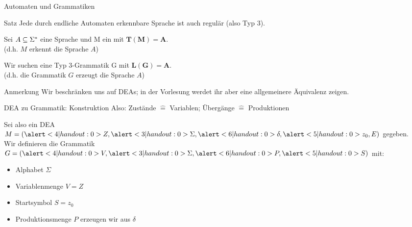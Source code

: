 \begin{frame}{Automaten und Grammatiken}
  \begin{exampleblock}{Satz}
    Jede durch  endliche Automaten erkennbare Sprache ist auch regulär (also Typ 3).
  \end{exampleblock}
  Sei \alert<2|handout:0>{$A \subseteq \Sigma^{*}$} eine Sprache und \alert<2|handout:0>{M ein } mit \alert<2-3|handout:0>{$\mathbf{T(M) = A}$}.\\
  (d.h. $M$ erkennt die Sprache $A$) \\
  \vspace{.3cm} %

  Wir suchen eine \alert<4|handout:0>{Typ 3-Grammatik G} mit \alert<4-5|handout:0>{$\mathbf{L(G) = A}$}.\\
  (d.h. die Grammatik $G$ erzeugt die Sprache $A$)
  \vspace{.3cm} %

  \begin{alertblock}{Anmerkung}
    Wir beschränken uns auf DEAs; in der Vorlesung werdet ihr aber eine allgemeinere Äquivalenz zeigen.
  \end{alertblock}
\end{frame}

\begin{frame}{DEA zu Grammatik: Konstruktion}
  Also: \alert<4-5|handout:0>{Zustände $\hat{=}$ Variablen}; \alert<6|handout:0>{Übergänge $\hat{=}$ Produktionen}

  Sei also ein \alert<2|handout:0>{DEA $M = (\alert<4|handout:0>{Z}, \alert<3|handout:0>{\Sigma}, \alert<6|handout:0>{\delta}, \alert<5|handout:0>{z_0}, E)$} gegeben. \\
    Wir definieren die \alert<2|handout:0>{Grammatik $G = (\alert<4|handout:0>{V}, \alert<3|handout:0>{\Sigma}, \alert<6|handout:0>{P}, \alert<5|handout:0>{S})$} mit:
  \begin{itemize}
    \item<3- | alert@3|handout:1> Alphabet $\Sigma$
    \item<4- | alert@4|handout:1> Variablenmenge $V = Z$
    \item<5- | alert@5|handout:1> Startsymbol $S = z_0$
    \item<6- | alert@6|handout:1> Produktionsmenge $P$ erzeugen wir aus $\delta$
  \end{itemize}
\end{frame}


